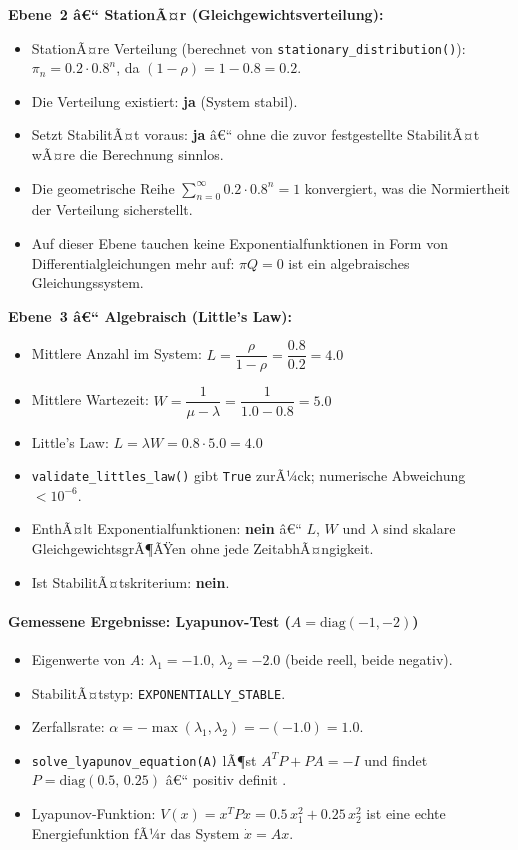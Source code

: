 ﻿\documentclass[a4paper,12pt]{scrreprt}
\theoremstyle{definition}
\begin{document}
\textbf{Ebene~2 â€“ StationÃ¤r (Gleichgewichtsverteilung):}
\begin{itemize}
	\item StationÃ¤re Verteilung (berechnet von
	\texttt{stationary\_distribution()}):
	$\pi_n = 0.2 \cdot 0.8^n$, da $(1-\rho) = 1 - 0.8 = 0.2$.
	\item Die Verteilung existiert: \textbf{ja} (System stabil).
	\item Setzt StabilitÃ¤t voraus: \textbf{ja} â€“ ohne die zuvor
	festgestellte StabilitÃ¤t wÃ¤re die Berechnung sinnlos.
	\item Die geometrische Reihe $\sum_{n=0}^\infty 0.2 \cdot 0.8^n = 1$
	konvergiert, was die Normiertheit der Verteilung sicherstellt.
	\item Auf dieser Ebene tauchen keine Exponentialfunktionen in Form
	von Differentialgleichungen mehr auf: $\pi Q = 0$ ist ein
	algebraisches Gleichungssystem.
\end{itemize}

\textbf{Ebene~3 â€“ Algebraisch (Little's Law):}
\begin{itemize}
	\item Mittlere Anzahl im System:
	$L = \dfrac{\rho}{1-\rho} = \dfrac{0.8}{0.2} = 4.0$
	\item Mittlere Wartezeit:
	$W = \dfrac{1}{\mu - \lambda} = \dfrac{1}{1.0 - 0.8} = 5.0$
	\item Little's Law:
	$L = \lambda W = 0.8 \cdot 5.0 = 4.0$ \checkmark
	\item \texttt{validate\_littles\_law()} gibt \texttt{True} zurÃ¼ck;
	numerische Abweichung $< 10^{-6}$.
	\item EnthÃ¤lt Exponentialfunktionen: \textbf{nein} â€“ $L$, $W$ und
	$\lambda$ sind skalare GleichgewichtsgrÃ¶ÃŸen ohne jede
	ZeitabhÃ¤ngigkeit.
	\item Ist StabilitÃ¤tskriterium: \textbf{nein}.
\end{itemize}

\paragraph{Gemessene Ergebnisse: Lyapunov-Test ($A = \text{diag}(-1,-2)$)}

\begin{itemize}
	\item Eigenwerte von $A$: $\lambda_1 = -1.0$, $\lambda_2 = -2.0$
	(beide reell, beide negativ).
	\item StabilitÃ¤tstyp: \texttt{EXPONENTIALLY\_STABLE}.
	\item Zerfallsrate: $\alpha = -\max(\lambda_1, \lambda_2) =
	-(-1.0) = 1.0$.
	\item \texttt{solve\_lyapunov\_equation(A)} lÃ¶st $A^T P + PA = -I$
	und findet
	$P = \text{diag}(0.5,\, 0.25)$ â€“ positiv definit \checkmark.
	\item Lyapunov-Funktion: $V(x) = x^T P x = 0.5\,x_1^2 + 0.25\,x_2^2$
	ist eine echte Energiefunktion fÃ¼r das System $\dot{x} = Ax$.
\end{itemize}
\end{document}
